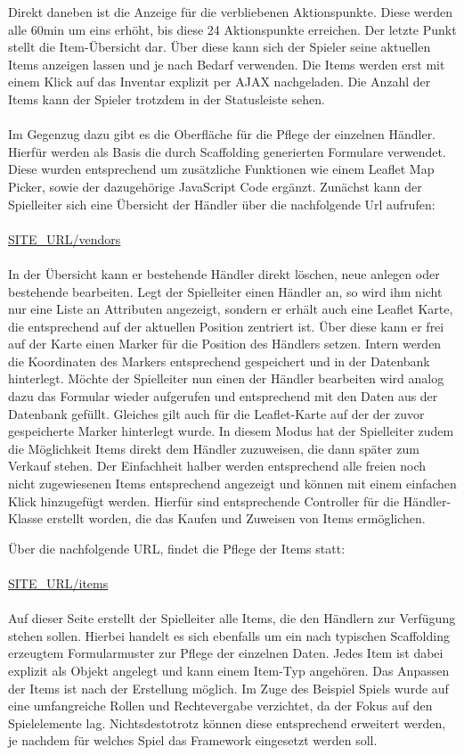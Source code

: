 Direkt daneben ist die Anzeige für die verbliebenen Aktionspunkte. Diese werden alle 60min um eins erhöht, bis diese 24 Aktionspunkte erreichen. Der letzte Punkt stellt die Item-Übersicht dar. Über diese kann sich der Spieler seine aktuellen Items anzeigen lassen und je nach Bedarf  verwenden. Die Items werden erst mit einem Klick auf das Inventar explizit per AJAX nachgeladen. Die Anzahl der Items kann der Spieler trotzdem in der Statusleiste sehen.
\\\\
Im Gegenzug dazu gibt es die Oberfläche für die Pflege der einzelnen Händler. Hierfür werden als Basis die durch Scaffolding generierten Formulare verwendet. Diese wurden entsprechend um zusätzliche Funktionen wie einem Leaflet Map Picker, sowie der dazugehörige JavaScript Code ergänzt. Zunächst kann der Spielleiter sich eine Übersicht der Händler über die nachfolgende Url aufrufen:
\\\\
\url{SITE\_URL/vendors}
\\\\
In der Übersicht kann er bestehende Händler direkt löschen, neue anlegen oder bestehende bearbeiten. 
Legt der Spielleiter einen Händler an, so wird ihm nicht nur eine Liste an Attributen angezeigt, sondern er erhält auch eine Leaflet Karte, die entsprechend auf der aktuellen Position zentriert ist. Über diese kann er frei auf der Karte einen Marker für die Position des Händlers setzen. Intern werden die Koordinaten des Markers entsprechend gespeichert und in der Datenbank hinterlegt. Möchte der Spielleiter nun einen der Händler bearbeiten wird analog dazu das Formular wieder aufgerufen und entsprechend mit den Daten aus der Datenbank gefüllt. Gleiches gilt auch für die Leaflet-Karte auf der der zuvor gespeicherte Marker hinterlegt wurde. In diesem Modus hat der Spielleiter zudem die Möglichkeit Items direkt dem Händler zuzuweisen, die dann später zum Verkauf stehen. Der Einfachheit halber werden entsprechend alle freien noch nicht zugewiesenen Items entsprechend angezeigt und können mit einem einfachen Klick hinzugefügt werden. Hierfür sind entsprechende Controller für die Händler-Klasse erstellt worden, die das Kaufen und Zuweisen von Items ermöglichen.

Über die nachfolgende URL, findet die Pflege der Items statt:
\\\\
\url{SITE\_URL/items}
\\\\
Auf dieser Seite erstellt der Spielleiter alle Items, die den Händlern zur Verfügung stehen sollen. Hierbei handelt es sich ebenfalls um ein nach typischen Scaffolding erzeugtem Formularmuster zur Pflege der einzelnen Daten. Jedes Item ist dabei explizit als Objekt angelegt und kann einem Item-Typ angehören. Das Anpassen der Items ist nach der Erstellung möglich. Im Zuge des Beispiel Spiels wurde auf eine umfangreiche Rollen und Rechtevergabe verzichtet, da der Fokus auf den Spielelemente lag. Nichtsdestotrotz können diese entsprechend erweitert werden, je nachdem für welches Spiel das Framework eingesetzt werden soll.

